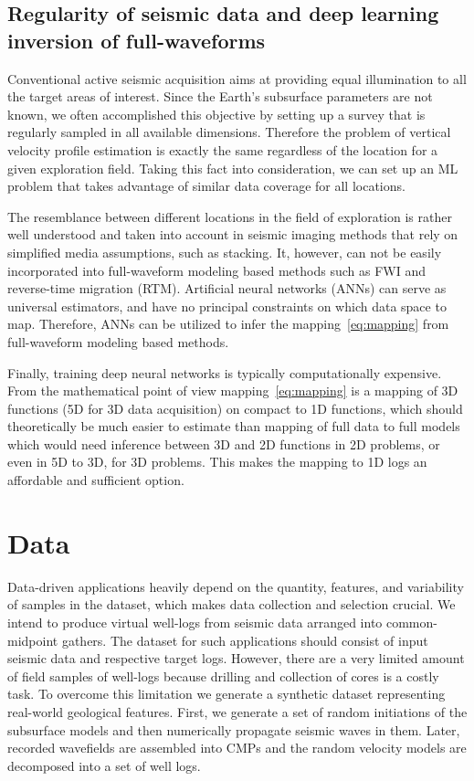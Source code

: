 \documentclass[manuscript]{geophysics}
\begin{document}
\subsection{Regularity of seismic data and deep learning inversion of full-waveforms}

Conventional active seismic acquisition aims at providing equal illumination to all the target areas of interest. Since the Earth's subsurface parameters are not known, we often accomplished this objective by setting up a survey that is regularly sampled in all available dimensions. Therefore the problem of vertical velocity profile estimation is exactly the same regardless of the location for a given exploration field. Taking this fact into consideration, we can set up an ML problem that takes advantage of similar data coverage for all locations. 

The resemblance between different locations in the field of exploration is rather well understood and taken into account in seismic imaging methods that rely on simplified media assumptions, such as stacking. It, however, can not be easily incorporated into full-waveform modeling based methods such as FWI and reverse-time migration (RTM).   
%
Artificial neural networks (ANNs) can serve as universal estimators, and have no principal constraints on which data space to map. Therefore, ANNs can be utilized to infer the mapping~\eqref{eq:mapping} from full-waveform modeling based methods. 

Finally, training deep neural networks is typically computationally expensive. From the mathematical point of view mapping~\eqref{eq:mapping} is a mapping of 3D functions (5D for 3D data acquisition) on compact to 1D functions, which should theoretically be much easier to estimate than mapping of full data to full models which would need inference between 3D and 2D functions in 2D problems, or even in 5D to 3D, for 3D problems. This makes the mapping to 1D logs an affordable and sufficient option.


\section{Data}
Data-driven applications heavily depend on the quantity, features, and variability of samples in the dataset, which makes data collection and selection crucial. 
%
We intend to produce virtual well-logs from seismic data arranged into common-midpoint gathers. The dataset for such applications should consist of input seismic data and respective target logs. However, there are a very limited amount of field samples of well-logs because drilling and collection of cores is a costly task. 
%
To overcome this limitation we generate a synthetic dataset representing real-world geological features. First, we generate a set of random initiations of the subsurface models and then numerically propagate seismic waves in them. Later, recorded wavefields are assembled into CMPs and the random velocity models are decomposed into a set of well logs.
\end{document}
